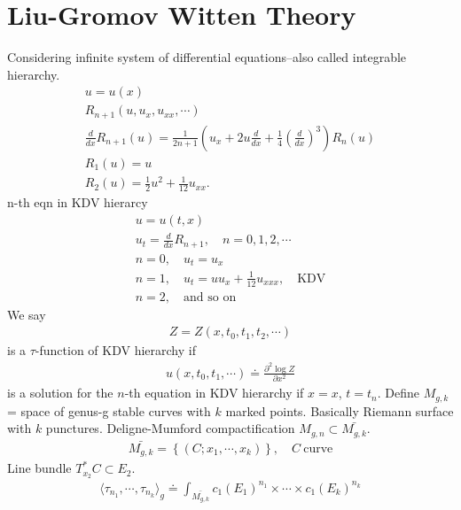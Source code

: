 \documentclass[12pt,reqno]{amsart}
\numberwithin{equation}{section}  %
\newcommand{\p}{\partial}
\begin{document}
  \section{Liu-Gromov Witten Theory} 
  \label{sec:liu}
  Considering infinite system of differential equations--also called integrable
  hierarchy. 
  \begin{gather*}
    u = u(x)
    \\
    R_{n+1}(u, u_{x}, u_{xx}, \cdots)
    \\
    \frac{d}{dx} R_{n+1}(u) = \frac{1}{2n+1} \left( u_{x} + 2u \frac{d}{dx} +
    \frac{1}{4}\left( \frac{d}{dx} \right)^{3} \right) R_{n}(u)
    \\
    R_{1}(u) = u
    \\
    R_{2}(u) = \frac{1}{2} u^{2} + \frac{1}{12} u_{xx}.
  \end{gather*}
  n-th eqn in KDV hierarcy
%
%
  \begin{gather*}
    u = u(t,x)
    \\
    u_{t} =  \frac{d}{dx}R_{n+1}, \quad n = 0,1,2,\cdots
    \\
    n = 0, \quad u_{t} = u_{x}
    \\
    n=1, \quad u_{t} = uu_{x} + \frac{1}{12}u_{xxx}, \quad \text{KDV}
    \\
    n=2, \quad \text{and so on}
  \end{gather*}
  We say
  \begin{gather*}
    Z = Z(x, t_{0}, t_{1}, t_{2}, \cdots)
  \end{gather*}
  is a $\tau$-function of KDV hierarchy if
  \begin{gather*}
    u(x, t_{0}, t_{1}, \cdots) \doteq \frac{\p^{2} \log Z}{\p x^{2}}
  \end{gather*}
  is a solution for the $n$-th equation in KDV hierarchy if $x =x$, $t =
  t_{n}$. 
  Define $M_{g,k}$ = space of genus-g stable curves with $k$ marked points.
  Basically Riemann surface with $k$ punctures. Deligne-Mumford compactification $ M_{g,n} \subset \bar{M_{g,k}}$.
  \begin{gather*}
    \bar{M_{g,k}} = \left\{ (C; x_{1}, \cdots, x_{k}) \right\}, \quad C \
    \text{curve} 
  \end{gather*}
  Line bundle $T_{x_{2}}^{*}C \subset E_{2}$.
  \begin{gather*}
    \langle \tau_{n_{1}}, \cdots, \tau_{n_{k}} \rangle_{g} \doteq
    \int_{\bar{M_{g,k}}} c_{1}(E_{1})^{n_{1}} \times \cdots \times
    c_{1}(E_{k})^{n_{k}}
  \end{gather*}
\end{document}
